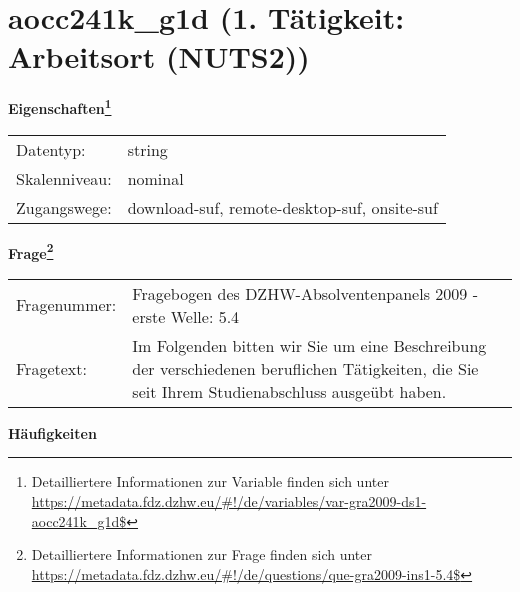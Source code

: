 
    \setcounter{footnote}{0}

    \vspace*{-1.8cm}
	\section{aocc241k\_g1d (1. Tätigkeit: Arbeitsort (NUTS2))}
	\label{section:aocc241k_g1d}



    \vspace*{0.5cm}
    \noindent\textbf{Eigenschaften\footnote{Detailliertere Informationen zur Variable finden sich unter
		\url{https://metadata.fdz.dzhw.eu/\#!/de/variables/var-gra2009-ds1-aocc241k_g1d$}}}\\
	\begin{tabularx}{\hsize}{@{}lX}
	Datentyp: & string \\
	Skalenniveau: & nominal \\
	Zugangswege: &
	  download-suf, 
	  remote-desktop-suf, 
	  onsite-suf
 \\
    \end{tabularx}



				\vspace*{0.5cm}
                \noindent\textbf{Frage\footnote{Detailliertere Informationen zur Frage finden sich unter
		              \url{https://metadata.fdz.dzhw.eu/\#!/de/questions/que-gra2009-ins1-5.4$}}}\\
				\begin{tabularx}{\hsize}{@{}lX}
					Fragenummer: &
					  Fragebogen des DZHW-Absolventenpanels 2009 - erste Welle:
					  5.4
 \\
					Fragetext: & Im Folgenden bitten wir Sie um eine Beschreibung der verschiedenen beruflichen Tätigkeiten, die Sie seit Ihrem Studienabschluss ausgeübt haben. \\
				\end{tabularx}





        		\vspace*{0.5cm}
                \noindent\textbf{Häufigkeiten}

